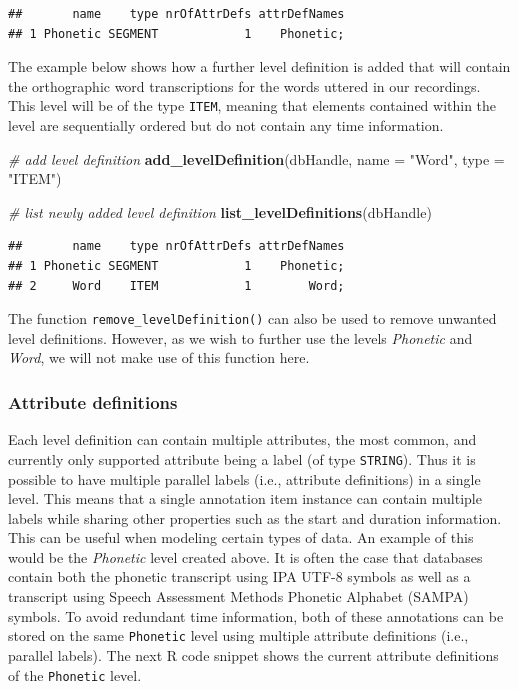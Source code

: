 \documentclass[]{book}
\newenvironment{Shaded}{\begin{snugshade}}{\end{snugshade}}
\newcommand{\CommentTok}[1]{\textcolor[rgb]{0.56,0.35,0.01}{\textit{#1}}}
\newcommand{\DataTypeTok}[1]{\textcolor[rgb]{0.13,0.29,0.53}{#1}}
\newcommand{\KeywordTok}[1]{\textcolor[rgb]{0.13,0.29,0.53}{\textbf{#1}}}
\newcommand{\NormalTok}[1]{#1}
\newcommand{\StringTok}[1]{\textcolor[rgb]{0.31,0.60,0.02}{#1}}
\theoremstyle{definition}
\theoremstyle{definition}
\theoremstyle{definition}
\theoremstyle{remark}
\begin{document}
\begin{verbatim}
##       name    type nrOfAttrDefs attrDefNames
## 1 Phonetic SEGMENT            1    Phonetic;
\end{verbatim}

The example below shows how a further level definition is added that
will contain the orthographic word transcriptions for the words uttered
in our recordings. This level will be of the type \texttt{ITEM}, meaning
that elements contained within the level are sequentially ordered but do
not contain any time information.

\begin{Shaded}
\begin{Highlighting}[]
\CommentTok{# add level definition}
\KeywordTok{add_levelDefinition}\NormalTok{(dbHandle,}
                    \DataTypeTok{name =} \StringTok{"Word"}\NormalTok{,}
                    \DataTypeTok{type =} \StringTok{"ITEM"}\NormalTok{)}

\CommentTok{# list newly added level definition}
\KeywordTok{list_levelDefinitions}\NormalTok{(dbHandle)}
\end{Highlighting}
\end{Shaded}

\begin{verbatim}
##       name    type nrOfAttrDefs attrDefNames
## 1 Phonetic SEGMENT            1    Phonetic;
## 2     Word    ITEM            1        Word;
\end{verbatim}

The function \texttt{remove\_levelDefinition()} can also be used to
remove unwanted level definitions. However, as we wish to further use
the levels \emph{Phonetic} and \emph{Word}, we will not make use of this
function here.

\hypertarget{attribute-definitions}{%
\subsubsection{Attribute definitions}\label{attribute-definitions}}

Each level definition can contain multiple attributes, the most common,
and currently only supported attribute being a label (of type
\texttt{STRING}). Thus it is possible to have multiple parallel labels
(i.e., attribute definitions) in a single level. This means that a
single annotation item instance can contain multiple labels while
sharing other properties such as the start and duration information.
This can be useful when modeling certain types of data. An example of
this would be the \emph{Phonetic} level created above. It is often the
case that databases contain both the phonetic transcript using IPA UTF-8
symbols as well as a transcript using Speech Assessment Methods Phonetic
Alphabet (SAMPA) symbols. To avoid redundant time information, both of
these annotations can be stored on the same \texttt{Phonetic} level
using multiple attribute definitions (i.e., parallel labels). The next R
code snippet shows the current attribute definitions of the
\texttt{Phonetic} level.
\end{document}
